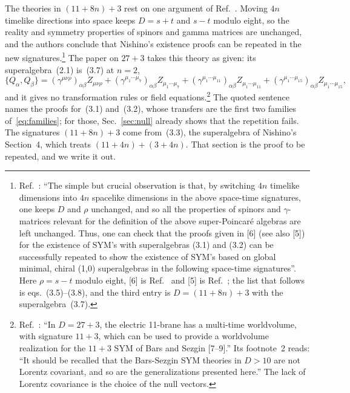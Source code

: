 The theories in $(11+8n)+3$ rest on one argument of Ref.~\cite[Sec.~III.A]{RiosMarraniChester2019}. Moving $4n$ timelike directions into space keeps $D=s+t$ and $s-t$ modulo eight, so the reality and symmetry properties of spinors and gamma matrices are unchanged, and the authors conclude that Nishino's existence proofs can be repeated in the new signatures.\footnote{Ref.~\cite[pp.~046004-4 and 046004-5]{RiosMarraniChester2019}: ``The simple but crucial observation is that, by switching $4n$ timelike dimensions into $4n$ spacelike dimensions in the above space-time signatures, one keeps $D$ and $\rho$ unchanged, and so all the properties of spinors and $\gamma$-matrices relevant for the definition of the above super-Poincar\'e algebras are left unchanged. Thus, one can check that the proofs given in [6] (see also [5]) for the existence of SYM's with superalgebras (3.1) and (3.2) can be successfully repeated to show the existence of SYM's based on global minimal, chiral (1,0) superalgebras in the following space-time signatures''. Here $\rho=s-t$ modulo eight, [6] is Ref.~\cite{Nishino1998} and [5] is Ref.~\cite{Sezgin1997}; the list that follows is eqs.~(3.5)--(3.8), and the third entry is $D=(11+8n)+3$ with the superalgebra~(3.7).} The paper on $27+3$ takes this theory as given: its superalgebra~(2.1) is~(3.7) at $n=2$,
\begin{equation}
\label{eq:rmc21}
\{Q_\alpha,Q_\beta\}=(\gamma^{\mu\nu\rho})_{\alpha\beta}Z_{\mu\nu\rho}+(\gamma^{\mu_1\cdots\mu_7})_{\alpha\beta}Z_{\mu_1\cdots\mu_7}+(\gamma^{\mu_1\cdots\mu_{11}})_{\alpha\beta}Z_{\mu_1\cdots\mu_{11}}+(\gamma^{\mu_1\cdots\mu_{15}})_{\alpha\beta}Z_{\mu_1\cdots\mu_{15}},
\end{equation}
and it gives no transformation rules or field equations.\footnote{Ref.~\cite[p.~2]{RiosMarraniChester2020}: ``In $D=27+3$, the electric 11-brane has a multi-time worldvolume, with signature $11+3$, which can be used to provide a worldvolume realization for the $11+3$ SYM of Bars and Sezgin [7--9].'' Its footnote~2 reads: ``It should be recalled that the Bars-Sezgin SYM theories in $D>10$ are not Lorentz covariant, and so are the generalizations presented here.'' The lack of Lorentz covariance is the choice of the null vectors.} The quoted sentence names the proofs for~(3.1) and~(3.2), whose transfers are the first two families of~\eqref{eq:families}; for those, Sec.~\ref{sec:null} already shows that the repetition fails. The signatures $(11+8n)+3$ come from~(3.3), the superalgebra of Nishino's Section~4, which treats $(11+4n)+(3+4n)$. That section is the proof to be repeated, and we write it out.

